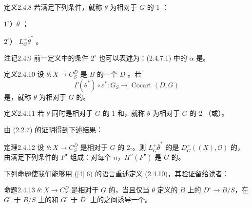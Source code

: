 \begin{SGAresult}{定义}{2.4.8}
若满足下列条件，就称 $\theta$ 为相对于 $G$ 的 $1$-：

$1^\circ$）$\theta$ ；

$2^\circ$） $L^+_G\bar\theta^*$ 。
\end{SGAresult}
\begin{SGAresult}{注记}{2.4.9}
前一定义中的条件 $2^\circ$ 也可以表述为：(2.4.7.1) 中的 $\alpha$ 是。
\end{SGAresult}
\begin{SGAresult}{定义}{2.4.10}
设 $\theta:X\to C_S^D$ 是 $B$ 的一个 $D$-。若
\[
\Gamma(\theta^*)\circ\varepsilon^*:G_S\longrightarrow\operatorname{Cocart}(D,G)
\]
是，就称 $\theta$ 为相对于 $G$ 的。
\end{SGAresult}
\begin{SGAresult}{定义}{2.4.11}
若 $\theta$ 同时是相对于 $G$ 的 $1$-和，就称 $\theta$ 为相对于 $G$ 的 $2$-（或）。
\end{SGAresult}
由 (2.2.7) 的证明得到下述结果：
\begin{SGAresult}{定理}{2.4.12}
设 $\theta:X\to C_S^D$ 是相对于 $G$ 的 $2$-。则 $L^+_G\bar\theta^*$ 的是 $D^+_G((\underline X),\mathcal O)$ 的，由满足下列条件的 $F^\bullet$ 组成：对每个 $n$，$H^n(F^\bullet)$ 是 $G$ 的。
\end{SGAresult}
下列命题使我们能够用 ([4] 6) 的语言重述定义 (2.4.10)，其验证留给读者：
\begin{SGAresult}{命题}{2.4.13}
$\theta:X\to C_S^D$ 是相对于 $G$ 的，当且仅当 $\theta$ 定义的 $B$ 上的 $D^\circ\to B/S$，在 $G^\circ$ 于 $B/S$ 上的和 $G^\circ$ 于 $D^\circ$ 上的之间诱导一个。
\end{SGAresult}

